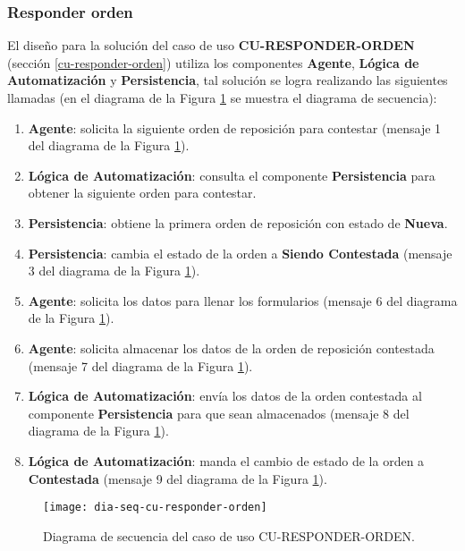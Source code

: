 \subsubsection{Responder orden}
El diseño para la solución del caso de uso \textbf{CU-RESPONDER-ORDEN} (sección \ref{cu-responder-orden}) utiliza los componentes \textbf{Agente}, \textbf{Lógica de Automatización} y \textbf{Persistencia}, tal solución se logra realizando las siguientes llamadas (en el diagrama de la Figura \ref{fig:dia-seq-cu-responder-orden} se muestra el diagrama de secuencia):
\begin{enumerate}
	\item \textbf{Agente}: solicita la siguiente orden de reposición para contestar (mensaje 1 del diagrama de la Figura \ref{fig:dia-seq-cu-responder-orden}).
	\item \textbf{Lógica de Automatización}: consulta el componente \textbf{Persistencia} para obtener la siguiente orden para contestar.
	\item \textbf{Persistencia}: obtiene la primera orden de reposición con estado de \textbf{Nueva}.
	\item \textbf{Persistencia}: cambia el estado de la orden a \textbf{Siendo Contestada} (mensaje 3 del diagrama de la Figura \ref{fig:dia-seq-cu-responder-orden}).
	\item \textbf{Agente}: solicita los datos para llenar los formularios (mensaje 6 del diagrama de la Figura \ref{fig:dia-seq-cu-responder-orden}).
	\item \textbf{Agente}: solicita almacenar los datos de la orden de reposición contestada (mensaje 7 del diagrama de la Figura \ref{fig:dia-seq-cu-responder-orden}).
	\item \textbf{Lógica de Automatización}: envía los datos de la orden contestada al componente \textbf{Persistencia} para que sean almacenados (mensaje 8 del diagrama de la Figura \ref{fig:dia-seq-cu-responder-orden}).
	\item \textbf{Lógica de Automatización}: manda el cambio de estado de la orden a \textbf{Contestada} (mensaje 9 del diagrama de la Figura \ref{fig:dia-seq-cu-responder-orden}).
\end{enumerate}

\begin{figure}[h]
	\centering
	\texttt{[image: dia-seq-cu-responder-orden]}
	\caption{Diagrama de secuencia del caso de uso CU-RESPONDER-ORDEN.}
	\label{fig:dia-seq-cu-responder-orden}
\end{figure}

